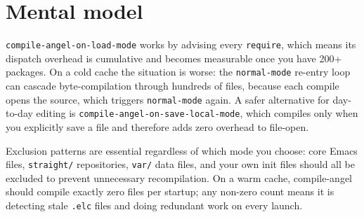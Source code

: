 \section{Mental model}
\texttt{compile-angel-on-load-mode} works by advising every
\texttt{require}, which means its dispatch overhead is cumulative and
becomes measurable once you have 200+ packages.  On a cold cache the
situation is worse: the \texttt{normal-mode} re-entry loop can cascade
byte-compilation through hundreds of files, because each compile opens
the source, which triggers \texttt{normal-mode} again.  A safer
alternative for day-to-day editing is
\texttt{compile-angel-on-save-local-mode}, which compiles only when you
explicitly save a file and therefore adds zero overhead to file-open.

Exclusion patterns are essential regardless of which mode you choose:
core Emacs files, \texttt{straight/} repositories, \texttt{var/} data
files, and your own init files should all be excluded to prevent
unnecessary recompilation.  On a warm cache, compile-angel should compile
exactly zero files per startup; any non-zero count means it is detecting
stale \texttt{.elc} files and doing redundant work on every launch.
